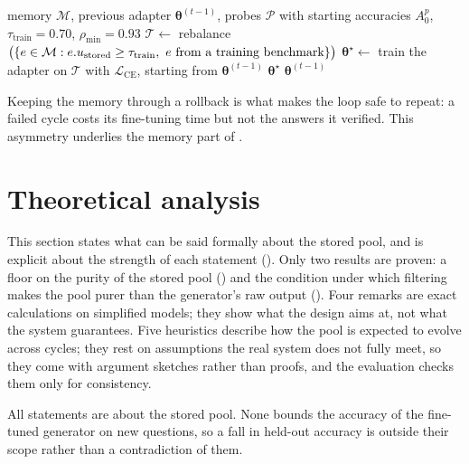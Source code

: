 \begin{algorithm}[!htbp]
\caption[Self-improvement loop with retention guard (Stage~8).]{Self-improvement loop with retention guard (Stage~8).}
\label{alg:sil}
\begin{algorithmic}[1]
\Require memory $\mathcal{M}$, previous adapter $\boldsymbol{\theta}^{(t-1)}$, probes $\mathcal{P}$ with starting accuracies $A_{0}^{p}$, $\tau_{\text{train}} = 0.70$, $\rho_{\min} = 0.93$
\State $\mathcal{T} \gets$ rebalance$\big(\{e \in \mathcal{M} : e.u_{\text{stored}} \ge \tau_{\text{train}},\ e \text{ from a training benchmark}\}\big)$
\State $\boldsymbol{\theta}^{\star} \gets$ train the adapter on $\mathcal{T}$ with $\mathcal{L}_{\mathrm{CE}}$, starting from $\boldsymbol{\theta}^{(t-1)}$
    \State \Return $\boldsymbol{\theta}^{\star}$ 
\Else
    \State \Return $\boldsymbol{\theta}^{(t-1)}$ 
\EndIf
\end{algorithmic}
\end{algorithm}

Keeping the memory through a rollback is what makes the loop safe to repeat: a failed cycle costs its fine-tuning time but not the answers it verified. This asymmetry underlies the memory part of .

\section{Theoretical analysis}
\label{sec:theory}

This section states what can be said formally about the stored pool, and is explicit about the strength of each statement (). Only two results are proven: a floor on the purity of the stored pool () and the condition under which filtering makes the pool purer than the generator's raw output (). Four remarks are exact calculations on simplified models; they show what the design aims at, not what the system guarantees. Five heuristics describe how the pool is expected to evolve across cycles; they rest on assumptions the real system does not fully meet, so they come with argument sketches rather than proofs, and the evaluation checks them only for consistency.

All statements are about the stored pool. None bounds the accuracy of the fine-tuned generator on new questions, so a fall in held-out accuracy is outside their scope rather than a contradiction of them.

